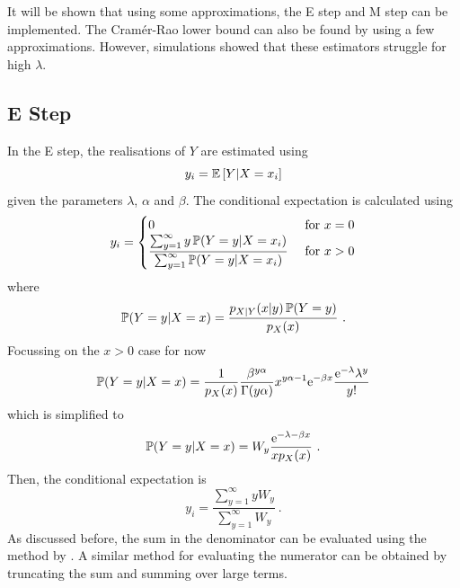 It will be shown that using some approximations, the E step and M step can be implemented. The Cram\'er-Rao lower bound \citep{rao1945information, cramer1946mathematical} can also be found by using a few approximations. However, simulations showed that these estimators struggle for high $\lambda$.

\subsection{E Step}

In the E step, the realisations of $Y$ are estimated using
\begin{equation}
  y_i =
  \operatorname{\mathbb{E}}\left[
    Y|X=x_i
  \right]
\end{equation}
given the parameters $\lambda$, $\alpha$ and $\beta$. The conditional expectation is calculated using
\begin{equation}
  y_i = 
  \begin{cases}
    0 & \text{ for } x=0 \\ 
    \dfrac{\sum_{y=1}^\infty y \operatorname{\mathbb{P}}(Y=y|X=x_i)}{\sum_{y=1}^\infty \operatorname{\mathbb{P}}(Y=y|X=x_i)} & \text{ for } x>0
  \end{cases}
\end{equation}
where
\begin{equation*}
  \operatorname{\mathbb{P}}(Y=y|X=x) = \frac{p_{X|Y}(x|y)\operatorname{\mathbb{P}}(Y=y)}{p_X(x)}
  \ .
\end{equation*}
Focussing on the $x>0$ case for now
\begin{equation*}
  \operatorname{\mathbb{P}}(Y=y|X=x) = \frac{1}{p_X(x)}\frac{\beta^{y\alpha}}{\Gamma(y\alpha)}x^{y\alpha-1}\mathrm{e}^{-\beta x}\frac{\mathrm{e}^{-\lambda}\lambda^y}{y!}
\end{equation*}
which is simplified to
\begin{equation}
  \operatorname{\mathbb{P}}(Y=y|X=x) = W_y \frac{\mathrm{e}^{-\lambda-\beta x}}{x p_X(x)} \ .
\end{equation}
Then, the conditional expectation is
\begin{equation}
  y_i = \frac{\sum_{y=1}^\infty y W_y}{\sum_{y=1}^\infty W_y}
  \ .
\end{equation}
As discussed before, the sum in the denominator can be evaluated using the method by \cite{dunn2005series}. A similar method for evaluating the numerator can be obtained by truncating the sum and summing over large terms.

